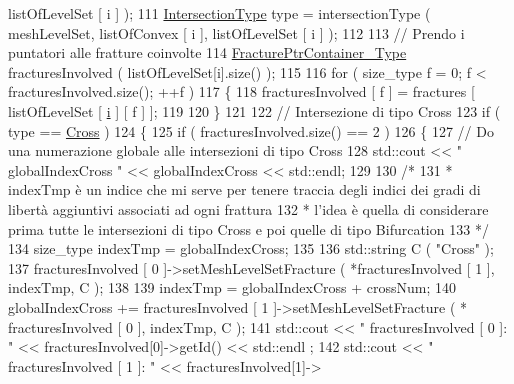 \begin{DoxyCode}
      listOfLevelSet [ i ] );
111            \hyperlink{classFractureIntersect_a9a4e4a784fa4c8e359767ed543f89dc5}{IntersectionType} type = intersectionType ( meshLevelSet, listOfConvex [ i ], 
      listOfLevelSet [ i ] );
112 
113            \textcolor{comment}{// Prendo i puntatori alle fratture coinvolte}
114            \hyperlink{FractureHandler_8h_a2f0b57e18ecf89912d7de0c87158009e}{FracturePtrContainer\_Type} fracturesInvolved ( listOfLevelSet[i].size() 
      );
115            
116            \textcolor{keywordflow}{for} ( size\_type f = 0; f < fracturesInvolved.size(); ++f )
117            \{
118                 fracturesInvolved [ f ] = fractures [ listOfLevelSet [ \hyperlink{matrici_8m_a6f6ccfcf58b31cb6412107d9d5281426}{i} ] [ f ] ];
119                 
120            \}
121 
122            \textcolor{comment}{// Intersezione di tipo Cross}
123            \textcolor{keywordflow}{if} ( type == \hyperlink{classFractureIntersect_a9a4e4a784fa4c8e359767ed543f89dc5a743fef1af81c0e61412fafb9438b380e}{Cross} )
124            \{
125                 \textcolor{keywordflow}{if} ( fracturesInvolved.size() == 2 )
126                 \{
127                     \textcolor{comment}{// Do una numerazione globale alle intersezioni di tipo Cross}
128                     std::cout << \textcolor{stringliteral}{" globalIndexCross "} << globalIndexCross << std::endl;
129 
130                     \textcolor{comment}{/*}
131 \textcolor{comment}{                     * indexTmp è un indice che mi serve per tenere traccia degli indici dei gradi di
       libertà aggiuntivi associati ad ogni frattura}
132 \textcolor{comment}{                     * l'idea è quella di considerare prima tutte le intersezioni di tipo Cross e poi
       quelle di tipo Bifurcation }
133 \textcolor{comment}{                     */}
134                     size\_type indexTmp = globalIndexCross;
135                     
136                     std::string C ( \textcolor{stringliteral}{"Cross"} );
137                     fracturesInvolved [ 0 ]->setMeshLevelSetFracture ( *fracturesInvolved [ 1 ], indexTmp, 
      C );
138                     
139                     indexTmp = globalIndexCross + crossNum;
140                     globalIndexCross += fracturesInvolved [ 1 ]->setMeshLevelSetFracture ( *
      fracturesInvolved [ 0 ], indexTmp, C );
141                     std::cout << \textcolor{stringliteral}{" fracturesInvolved [ 0 ]: "} << fracturesInvolved[0]->getId() << std::endl
      ;
142                                         std::cout << \textcolor{stringliteral}{" fracturesInvolved [ 1 ]: "} << fracturesInvolved[1]->

\end{DoxyCode}
